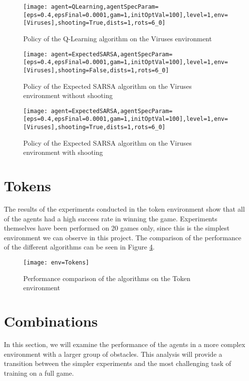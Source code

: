 \begin{figure}[h]
    \centering
    \texttt{[image: agent=QLearning,agentSpecParam=[eps=0.4,epsFinal=0.0001,gam=1,initOptVal=100],level=1,env=[Viruses],shooting=True,dists=1,rots=6\_0]}
    \caption{Policy of the Q-Learning algorithm on the Viruses environment}
    \label{fig:qvir}
\end{figure}

\begin{figure}[h]
    \centering
    \texttt{[image: agent=ExpectedSARSA,agentSpecParam=[eps=0.4,epsFinal=0.0001,gam=1,initOptVal=100],level=1,env=[Viruses],shooting=False,dists=1,rots=6\_0]}
    \caption{Policy of the Expected SARSA algorithm on the Viruses environment without shooting}
    \label{fig:esvir}
\end{figure}


\begin{figure}[h]
    \centering
    \texttt{[image: agent=ExpectedSARSA,agentSpecParam=[eps=0.4,epsFinal=0.0001,gam=1,initOptVal=100],level=1,env=[Viruses],shooting=True,dists=1,rots=6\_0]}
    \caption{Policy of the Expected SARSA algorithm on the Viruses environment with shooting}
    \label{fig:esvirShooting}
\end{figure}

\section{Tokens}
The results of the experiments conducted in the token environment show that all of the agents had a high success rate in winning the game. Experiments themselves have been performed on 20 games only, since this is the simplest environment we can observe in this project. The comparison of the performance of the different algorithms can be seen in Figure \ref{fig:compTok}.

\begin{figure}[h]
    \centering
    \texttt{[image: env=Tokens]}
    \caption{Performance comparison of the algorithms on the Token environment}
    \label{fig:compTok}
\end{figure}

\section{Combinations}
In this section, we will examine the performance of the agents in a more complex environment with a larger group of obstacles. This analysis will provide a transition between the simpler experiments and the most challenging task of training on a full game.
